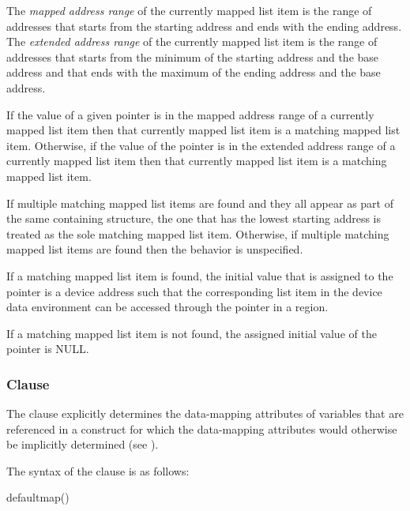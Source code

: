 \begin{ccppspecific}
The \emph{mapped address range} of the currently mapped list item is the range
of addresses that starts from the starting address and ends with the ending
address. The \emph{extended address range} of the currently mapped list item
is the range of addresses that starts from the minimum of the starting address
and the base address and that ends with the maximum of the ending address and
the base address.

If the value of a given pointer is in the mapped address range of a currently
mapped list item then that currently mapped list item is a matching mapped
list item.  Otherwise, if the value of the pointer is in the extended address
range of a currently mapped list item then that currently mapped list item is
a matching mapped list item.

If multiple matching mapped list items are found and they all appear as part
of the same containing structure, the one that has the lowest starting address
is treated as the sole matching mapped list item. Otherwise, if multiple
matching mapped list items are found then the behavior is unspecified.

If a matching mapped list item is found, the initial value that is assigned to
the pointer is a device address such that the corresponding list item in the
device data environment can be accessed through the pointer in a
 region.

If a matching mapped list item is not found, the assigned initial value of the
pointer is NULL.
\end{ccppspecific}


\subsubsection{ Clause}
\label{subsubsec:defaultmap clause}

\summary

The  clause explicitly determines the data-mapping attributes 
of variables that are referenced in a  construct for which the
data-mapping attributes  would otherwise be implicitly determined  (see 
).

\syntax
The syntax of the  clause is as follows:

\begin{ompSyntax}
  defaultmap()
\end{ompSyntax}


